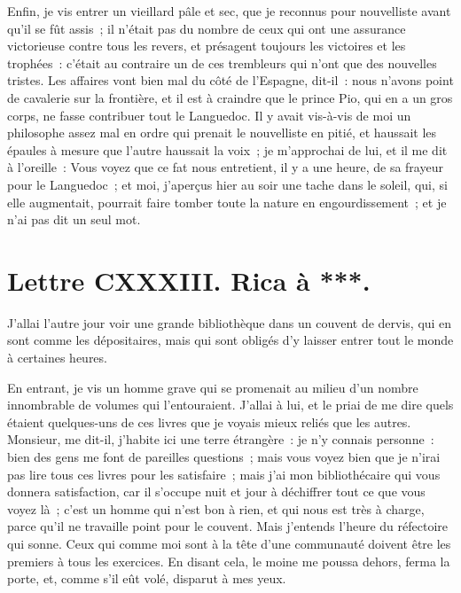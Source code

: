 \documentclass[french,twoside]{book} %
\newcommand{\dateline}[1]{\medskip{\RaggedLeft{#1}\par}\bigskip}
\begin{document}
Enfin, je vis entrer un vieillard pâle et sec, que je reconnus pour nouvelliste avant qu’il se fût assis ; il n’était pas du nombre de ceux qui ont une assurance victorieuse contre tous les revers, et présagent toujours les victoires et les trophées : c’était au contraire un de ces trembleurs qui n’ont que des nouvelles tristes. Les affaires vont bien mal du côté de l’Espagne, dit-il : nous n’avons point de cavalerie sur la frontière, et il est à craindre que le prince Pio, qui en a un gros corps, ne fasse contribuer tout le Languedoc. Il y avait vis-à-vis de moi un philosophe assez mal en ordre qui prenait le nouvelliste en pitié, et haussait les épaules à mesure que l’autre haussait la voix ; je m’approchai de lui, et il me dit à l’oreille : Vous voyez que ce fat nous entretient, il y a une heure, de sa frayeur pour le Languedoc ; et moi, j’aperçus hier au soir une tache dans le soleil, qui, si elle augmentait, pourrait faire tomber toute la nature en engourdissement ; et je n’ai pas dit un seul mot.\par

\dateline{De Paris, le 17 de la lune de Rhamazan, 1719.}
\section[{Lettre CXXXIII. Rica à ***.}]{Lettre CXXXIII. Rica à ***.}\renewcommand{\leftmark}{Lettre CXXXIII. Rica à ***.}

\noindent J’allai l’autre jour voir une grande bibliothèque dans un couvent de dervis, qui en sont comme les dépositaires, mais qui sont obligés d’y laisser entrer tout le monde à certaines heures.\par
En entrant, je vis un homme grave qui se promenait au milieu d’un nombre innombrable de volumes qui l’entouraient. J’allai à lui, et le priai de me dire quels étaient quelques-uns de ces livres que je voyais mieux reliés que les autres. Monsieur, me dit-il, j’habite ici une terre étrangère : je n’y connais personne : bien des gens me font de pareilles questions ; mais vous voyez bien que je n’irai pas lire tous ces livres pour les satisfaire ; mais j’ai mon bibliothécaire qui vous donnera satisfaction, car il s’occupe nuit et jour à déchiffrer tout ce que vous voyez là ; c’est un homme qui n’est bon à rien, et qui nous est très à charge, parce qu’il ne travaille point pour le couvent. Mais j’entends l’heure du réfectoire qui sonne. Ceux qui comme moi sont à la tête d’une communauté doivent être les premiers à tous les exercices. En disant cela, le moine me poussa dehors, ferma la porte, et, comme s’il eût volé, disparut à mes yeux.\par
\end{document}
